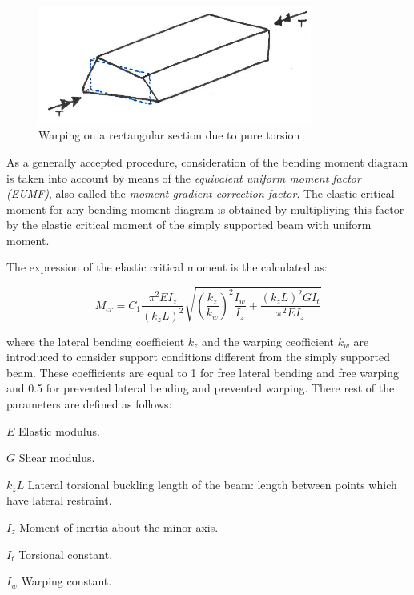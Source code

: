 \begin{figure}
\centering
\includegraphics[width=90mm]{materials/figures/warping}
\caption{Warping on a rectangular section due to pure torsion}\label{fg_warping}
\end{figure}

As a generally accepted procedure, consideration of the bending moment diagram is taken into account by means of the \emph{equivalent uniform moment factor (EUMF)}, also called the \emph{moment gradient correction factor}. The elastic critical moment for any bending moment diagram is obtained by multipliying this factor by the elastic critical moment of the simply supported beam with uniform moment.

The expression of the elastic critical moment is the calculated as:

\begin{equation}
M_{cr}= C_1 \frac{\pi^2 EI_z}{(k_z L)^2} \sqrt{(\frac{k_z}{k_w})^2 \frac{I_w}{I_z}+\frac{(k_z L)^2 GI_t}{\pi^2 EI_z}} 
\end{equation}

\noindent where the lateral bending coefficient $k_z$ and the warping ceofficient $k_w$ are introduced to consider support conditions different from the simply supported beam. These coefficients are equal to 1 for free lateral bending and free warping and 0.5 for prevented lateral bending and prevented warping. There rest of the parameters are defined as follows:

\begin{description}
\item{$E$} Elastic modulus.
\item{$G$} Shear modulus.
\item{$k_z L$} Lateral torsional buckling length of the beam: length between points which have lateral restraint.
\item{$I_z$} Moment of inertia about the minor axis.
\item{$I_t$} Torsional constant.
\item{$I_w$} Warping constant.
\end{description}

